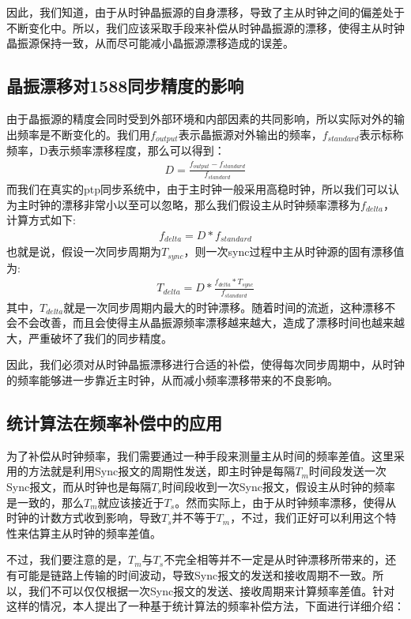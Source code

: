 因此，我们知道，由于从时钟晶振源的自身漂移，导致了主从时钟之间的偏差处于不断变化中。所以，我们应该采取手段来补偿从时钟晶振源的漂移，使得主从时钟晶振源保持一致，从而尽可能减小晶振源漂移造成的误差。

\subsection{晶振漂移对1588同步精度的影响}
由于晶振源的精度会同时受到外部环境和内部因素的共同影响，所以实际对外的输出频率是不断变化的。我们用$f_{output}$表示晶振源对外输出的频率，$f_{standard}$表示标称频率，D表示频率漂移程度，那么可以得到：
\begin {align}
D = \frac{f_{output} - f_{standard}}{f_{standard}}
\end{align}
而我们在真实的ptp同步系统中，由于主时钟一般采用高稳时钟，所以我们可以认为主时钟的漂移非常小以至可以忽略，那么我们假设主从时钟频率漂移为$f_{delta}$，计算方式如下:
\begin {align}
f_{delta} = D * f_{standard}
\end{align}
也就是说，假设一次同步周期为$T_{sync}$，则一次sync过程中主从时钟源的固有漂移值为:
\begin {align}
T_{delta} = D * \frac{f_{delta} * T_{sync}}{f_{standard}}
\end{align}
其中，$T_{delta}$就是一次同步周期内最大的时钟漂移。随着时间的流逝，这种漂移不会不会改善，而且会使得主从晶振源频率漂移越来越大，造成了漂移时间也越来越大，严重破坏了我们的同步精度。

因此，我们必须对从时钟晶振漂移进行合适的补偿，使得每次同步周期中，从时钟的频率能够进一步靠近主时钟，从而减小频率漂移带来的不良影响。

\subsection{统计算法在频率补偿中的应用}
为了补偿从时钟频率，我们需要通过一种手段来测量主从时间的频率差值。这里采用的方法就是利用Sync报文的周期性发送，即主时钟是每隔$T_{m}$时间段发送一次Sync报文，而从时钟也是每隔$T_{s}$时间段收到一次Sync报文，假设主从时钟的频率是一致的，那么$T_{m}$就应该接近于$T_{s}$。然而实际上，由于从时钟频率漂移，使得从时钟的计数方式收到影响，导致$T_{s}$并不等于$T_{m}$，不过，我们正好可以利用这个特性来估算主从时钟的频率差值。

不过，我们要注意的是，$T_{m}$与$T_{s}$不完全相等并不一定是从时钟漂移所带来的，还有可能是链路上传输的时间波动，导致Sync报文的发送和接收周期不一致。所以，我们不可以仅仅根据一次Sync报文的发送、接收周期来计算频率差值。针对这样的情况，本人提出了一种基于统计算法的频率补偿方法，下面进行详细介绍：

